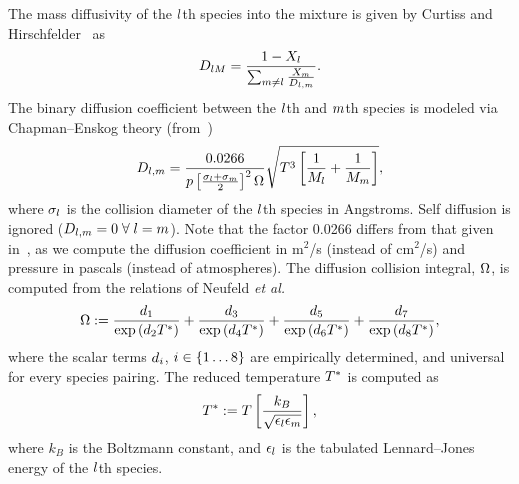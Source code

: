 The mass diffusivity of the $l$th species into the mixture is given by Curtiss and Hirschfelder~\cite{Curtiss1949} as
%
\begin{equation}\label{eq:curtissAvgDiff}
	D_{l M} = \frac{1 - X_{l}}{\sum_{m \neq l} \frac{X_{m}}{D_{l, m}}}.
\end{equation}
%
The binary diffusion coefficient between the $l$th and $m$th species is modeled via Chapman--Enskog theory (from~\cite{propGasLiquid})
%
\begin{equation}
	D_{l, m} = \frac{0.0266}{p \left[\frac{\sigma_{l} + \sigma_{m}}{2}\right]^2 \Omega} \sqrt{T^3 \left[\frac{1}{M_{l}} + \frac{1}{M_{m}}\right]},
\end{equation}
%
where $\sigma_{l}$ is the collision diameter of the $l$th species in Angstroms. Self diffusion is ignored ($D_{l, m} = 0 \; \forall \; l = m$). Note that the factor 0.0266 differs from that given in~\cite{propGasLiquid}, as we compute the diffusion coefficient in m$^2$/s (instead of cm$^2$/s) and pressure in pascals (instead of atmospheres). The diffusion collision integral, $\Omega$, is computed from the relations of Neufeld \textit{et al.}~\cite{Neufeld1972}
%
\begin{equation}
	\Omega := \frac{d_{1}}{\text{exp} \left(d_{2} T^*\right)} + \frac{d_{3}}{\text{exp} \left(d_{4} T^*\right)} + \frac{d_{5}}{\text{exp} \left(d_{6} T^*\right)} + \frac{d_{7}}{\text{exp} \left(d_{8} T^*\right)},
\end{equation}
%
where the scalar terms $d_{i}$, $i \in \{1 \hdots 8\}$ are empirically determined, and universal for every species pairing. The reduced temperature $T^*$ is computed as
\begin{equation}
	T^* := T \left[ \frac{k_B}{\sqrt{\epsilon_{l} \epsilon_{m}}} \right],
\end{equation}
where $k_B$ is the Boltzmann constant, and $\epsilon_{l}$ is the tabulated Lennard--Jones energy of the $l$th species.

